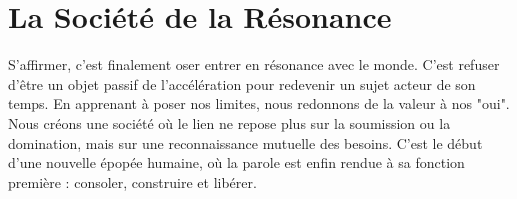 \section{La Société de la Résonance}
S'affirmer, c'est finalement oser entrer en résonance avec le monde. C'est refuser d'être un objet passif de l'accélération pour redevenir un sujet acteur de son temps. En apprenant à poser nos limites, nous redonnons de la valeur à nos "oui". Nous créons une société où le lien ne repose plus sur la soumission ou la domination, mais sur une reconnaissance mutuelle des besoins. C'est le début d'une nouvelle épopée humaine, où la parole est enfin rendue à sa fonction première : consoler, construire et libérer.
